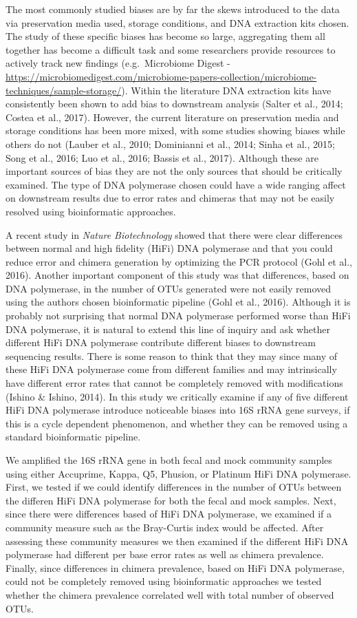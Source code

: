 \documentclass[12pt,]{article}
\begin{document}
The most commonly studied biases are by far the skews introduced to the
data via preservation media used, storage conditions, and DNA extraction
kits chosen. The study of these specific biases has become so large,
aggregating them all together has become a difficult task and some
researchers provide resources to actively track new findings
(e.g.~Microbiome Digest -
\url{https://microbiomedigest.com/microbiome-papers-collection/microbiome-techniques/sample-storage/}).
Within the literature DNA extraction kits have consistently been shown
to add bias to downstream analysis (Salter et al., 2014; Costea et al.,
2017). However, the current literature on preservation media and storage
conditions has been more mixed, with some studies showing biases while
others do not (Lauber et al., 2010; Dominianni et al., 2014; Sinha et
al., 2015; Song et al., 2016; Luo et al., 2016; Bassis et al., 2017).
Although these are important sources of bias they are not the only
sources that should be critically examined. The type of DNA polymerase
chosen could have a wide ranging affect on downstream results due to
error rates and chimeras that may not be easily resolved using
bioinformatic approaches.

A recent study in \emph{Nature Biotechnology} showed that there were
clear differences between normal and high fidelity (HiFi) DNA polymerase
and that you could reduce error and chimera generation by optimizing the
PCR protocol (Gohl et al., 2016). Another important component of this
study was that differences, based on DNA polymerase, in the number of
OTUs generated were not easily removed using the authors chosen
bioinformatic pipeline (Gohl et al., 2016). Although it is probably not
surprising that normal DNA polymerase performed worse than HiFi DNA
polymerase, it is natural to extend this line of inquiry and ask whether
different HiFi DNA polymerase contribute different biases to downstream
sequencing results. There is some reason to think that they may since
many of these HiFi DNA polymerase come from different families and may
intrinsically have different error rates that cannot be completely
removed with modifications (Ishino \& Ishino, 2014). In this study we
critically examine if any of five different HiFi DNA polymerase
introduce noticeable biases into 16S rRNA gene surveys, if this is a
cycle dependent phenomenon, and whether they can be removed using a
standard bioinformatic pipeline.

We amplified the 16S rRNA gene in both fecal and mock community samples
using either Accuprime, Kappa, Q5, Phusion, or Platinum HiFi DNA
polymerase. First, we tested if we could identify differences in the
number of OTUs between the differen HiFi DNA polymerase for both the
fecal and mock samples. Next, since there were differences based of HiFi
DNA polymerase, we examined if a community measure such as the
Bray-Curtis index would be affected. After assessing these community
measures we then examined if the different HiFi DNA polymerase had
different per base error rates as well as chimera prevalence. Finally,
since differences in chimera prevalence, based on HiFi DNA polymerase,
could not be completely removed using bioinformatic approaches we tested
whether the chimera prevalence correlated well with total number of
observed OTUs.
\end{document}

